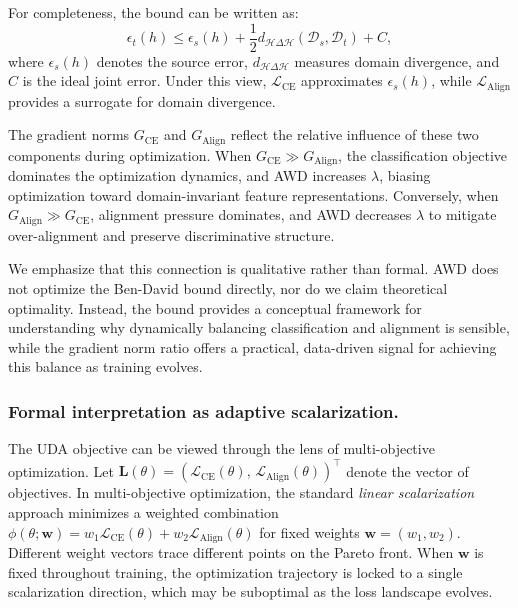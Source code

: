 \documentclass[pdflatex,sn-mathphys-num]{sn-jnl}
\theoremstyle{thmstyleone}
\theoremstyle{thmstyletwo}
\theoremstyle{thmstylethree}
\begin{document}
For completeness, the bound can be written as:
\begin{equation}
\epsilon_t(h) \leq \epsilon_s(h) + \frac{1}{2} d_{\mathcal{H}\Delta\mathcal{H}}(\mathcal{D}_s, \mathcal{D}_t) + C,
\end{equation}
where $\epsilon_s(h)$ denotes the source error, $d_{\mathcal{H}\Delta\mathcal{H}}$ measures domain divergence, and $C$ is the ideal joint error. Under this view, $\mathcal{L}_{\text{CE}}$ approximates $\epsilon_s(h)$, while $\mathcal{L}_{\text{Align}}$ provides a surrogate for domain divergence.

The gradient norms $G_{\text{CE}}$ and $G_{\text{Align}}$ reflect the relative influence of these two components during optimization. When $G_{\text{CE}} \gg G_{\text{Align}}$, the classification objective dominates the optimization dynamics, and AWD increases $\lambda$, biasing optimization toward domain-invariant feature representations. Conversely, when $G_{\text{Align}} \gg G_{\text{CE}}$, alignment pressure dominates, and AWD decreases $\lambda$ to mitigate over-alignment and preserve discriminative structure.

We emphasize that this connection is qualitative rather than formal. AWD does not optimize the Ben-David bound directly, nor do we claim theoretical optimality. Instead, the bound provides a conceptual framework for understanding why dynamically balancing classification and alignment is sensible, while the gradient norm ratio offers a practical, data-driven signal for achieving this balance as training evolves.

\subsubsection{Formal interpretation as adaptive scalarization.}
The UDA objective can be viewed through the lens of multi-objective optimization. Let $\mathbf{L}(\theta) = (\mathcal{L}_{\text{CE}}(\theta),\, \mathcal{L}_{\text{Align}}(\theta))^\top$ denote the vector of objectives. In multi-objective optimization, the standard \emph{linear scalarization} approach minimizes a weighted combination $\phi(\theta; \mathbf{w}) = w_1 \mathcal{L}_{\text{CE}}(\theta) + w_2 \mathcal{L}_{\text{Align}}(\theta)$ for fixed weights $\mathbf{w} = (w_1, w_2)$. Different weight vectors trace different points on the Pareto front. When $\mathbf{w}$ is fixed throughout training, the optimization trajectory is locked to a single scalarization direction, which may be suboptimal as the loss landscape evolves.
\end{document}
